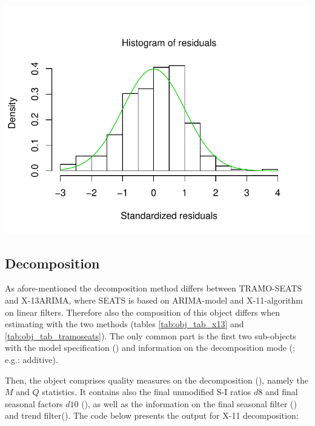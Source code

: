 \documentclass[article]{jss}
\begin{document}
\begin{CodeChunk}


\begin{center}\includegraphics{img/img-unnamed-chunk-6-1} \end{center}

\end{CodeChunk}

\hypertarget{decomposition}{%
\subsection{Decomposition}\label{decomposition}}

As afore-mentioned the decomposition method differs between TRAMO-SEATS
and X-13ARIMA, where SEATS is based on ARIMA-model and X-11-algorithm on
linear filters. Therefore also the composition of this object differs
when estimating with the two methods (tables \ref{tab:obj_tab_x13} and
\ref{tab:obj_tab_tramoseats}). The only common part is the first two
sub-objects with the model specification () and
information on the decomposition mode (; e.g.: additive).

Then, the  object comprises quality measures on
the decomposition (), namely the \(M\) and \(Q\)
statistics. It contains also the final unmodified S-I ratios \(d8\) and
final seasonal factors \(d10\) (), as well as the
information on the final seasonal filter () and trend
filter(). The code below presents the output for X-11
decomposition:
\end{document}
